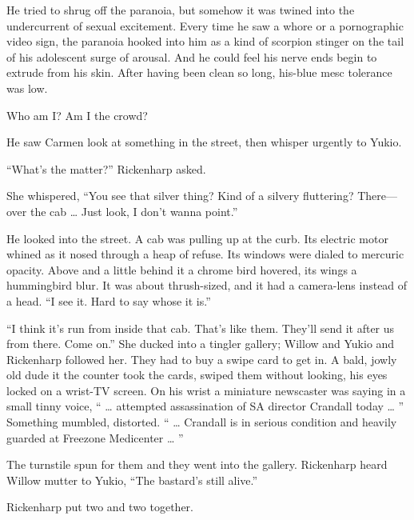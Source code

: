 He tried to shrug off the paranoia, but somehow it was twined into the undercurrent of sexual excitement. Every time he saw a whore or a pornographic video sign, the paranoia hooked into him as a kind of scorpion stinger on the tail of his adolescent surge of arousal. And he could feel his nerve ends begin to extrude from his skin. After having been clean so long, his-blue mesc tolerance was low.

Who am I? Am I the crowd?

He saw Carmen look at something in the street, then whisper urgently to Yukio.

“What’s the matter?” Rickenharp asked.

She whispered, “You see that silver thing? Kind of a silvery fluttering? There—over the cab … Just look, I don’t wanna point.”

He looked into the street. A cab was pulling up at the curb. Its electric motor whined as it nosed through a heap of refuse. Its windows were dialed to mercuric opacity. Above and a little behind it a chrome bird hovered, its wings a hummingbird blur. It was about thrush-sized, and it had a camera-lens instead of a head. “I see it. Hard to say whose it is.”

“I think it’s run from inside that cab. That’s like them. They’ll send it after us from there. Come on.” She ducked into a tingler gallery; Willow and Yukio and Rickenharp followed her. They had to buy a swipe card to get in. A bald, jowly old dude it the counter took the cards, swiped them without looking, his eyes locked on a wrist-TV screen. On his wrist a miniature newscaster was saying in a small tinny voice, “ … attempted assassination of SA director Crandall today … ” Something mumbled, distorted. “ … Crandall is in serious condition and heavily guarded at Freezone Medicenter … ”

The turnstile spun for them and they went into the gallery. Rickenharp heard Willow mutter to Yukio, “The bastard’s still alive.”

Rickenharp put two and two together.

